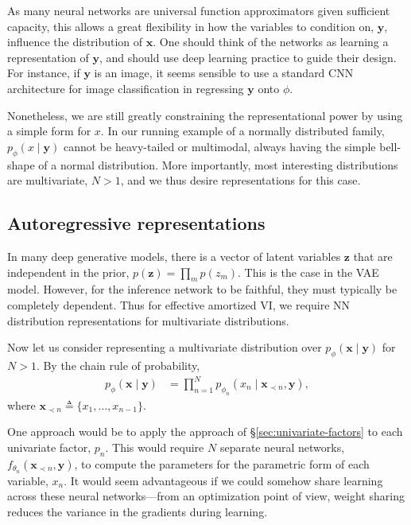 As many neural networks are universal function approximators given sufficient capacity, this allows a great flexibility in how the variables to condition on, $\mathbf{y}$, influence the distribution of $\mathbf{x}$. One should think of the networks as learning a representation of $\mathbf{y}$, and should use deep learning practice to guide their design. For instance, if $\mathbf{y}$ is an image, it seems sensible to use a standard CNN architecture for image classification in regressing $\mathbf{y}$ onto $\phi$.

Nonetheless, we are still greatly constraining the representational power by using a simple form for $x$. In our running example of a normally distributed family, $p_\phi(x\mid\mathbf{y})$ cannot be heavy-tailed or multimodal, always having the simple bell-shape of a normal distribution. More importantly, most interesting distributions are multivariate, $N>1$, and we thus desire representations for this case.

\subsection{Autoregressive representations}
In many deep generative models, there is a vector of latent variables $\mathbf{z}$ that are independent in the prior, $p(\mathbf{z})=\prod_m p(z_m)$. This is the case in the VAE model. However, for the inference network to be faithful, they must typically be completely dependent. Thus for effective amortized VI, we require NN distribution representations for multivariate distributions. 

Now let us consider representing a multivariate distribution over $p_\phi(\mathbf{x}\mid\mathbf{y})$ for $N>1$. By the chain rule of probability,
\begin{align}\label{eq:autoregressive-distribution}
	p_\phi(\mathbf{x}\mid\mathbf{y}) &= \prod^N_{n=1}p_{\phi_n}(x_n\mid\mathbf{x}_{\prec n},\mathbf{y}),
\end{align}
where $\mathbf{x}_{\prec n}\triangleq\{x_1,\ldots,x_{n-1}\}$. 

One approach would be to apply the approach of \S\ref{sec:univariate-factors} to each univariate factor, $p_n$. This would require $N$ separate neural networks, $f_{\theta_n}(\mathbf{x}_{\prec n},\mathbf{y})$, to compute the parameters for the parametric form of each variable, $x_n$. It would seem advantageous if we could somehow share learning across these neural networks---from an optimization point of view, weight sharing reduces the variance in the gradients during learning.

